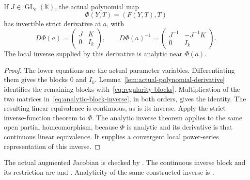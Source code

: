 \begin{lemma}
\label{lem:augmented-analytic-inverse}
If $J\in\operatorname{GL}_e(\mathbb K)$, the actual polynomial map
\[
 \Phi(Y,T)=(F(Y,T),T)
\]
has invertible strict derivative at $a$, with
\begin{equation}
 D\Phi(a)=\begin{pmatrix}J&K\\0&I_k\end{pmatrix},\qquad
 D\Phi(a)^{-1}=\begin{pmatrix}J^{-1}&-J^{-1}K\\0&I_k\end{pmatrix}.
 \label{eq:analytic-block-inverse}
\end{equation}
The local inverse supplied by this derivative is analytic near $\Phi(a)$.
\end{lemma}
\begin{proof}
The lower equations are the actual parameter variables. Differentiating
them gives the blocks $0$ and $I_k$. Lemma~\ref{lem:actual-polynomial-derivative}
identifies the remaining blocks with~\eqref{eq:regularity-blocks}.
Multiplication of the two matrices in~\eqref{eq:analytic-block-inverse},
in both orders, gives the identity. The resulting linear equivalence is
continuous, as is its inverse. Apply the strict inverse-function theorem to
$\Phi$. The analytic inverse theorem applies to the same open partial
homeomorphism, because $\Phi$ is analytic and its derivative is that
continuous linear equivalence. It supplies a convergent local power-series
representation of this inverse.
\end{proof}
The actual augmented Jacobian is checked by
.
The continuous inverse block and its restriction are
 and
.
Analyticity of the same constructed inverse is
.

